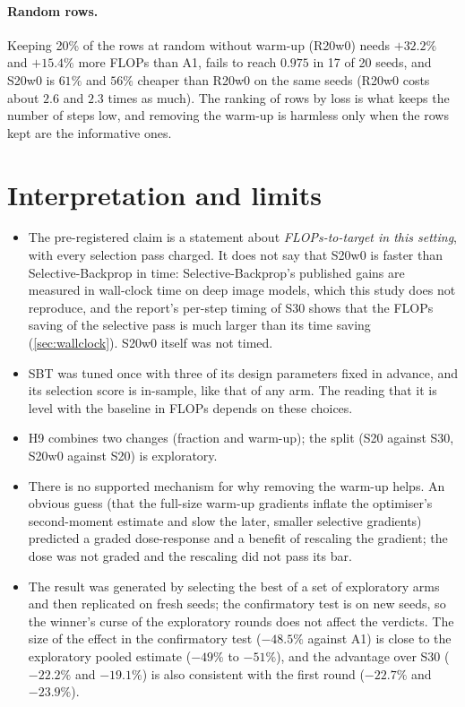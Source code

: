 \paragraph{Random rows.} Keeping 20\% of the rows at random without warm-up (R20w0) needs $+32.2\%$ and $+15.4\%$ more FLOPs than A1, fails to reach $0.975$ in 17 of 20 seeds, and S20w0 is $61\%$ and $56\%$ cheaper than R20w0 on the same seeds (R20w0 costs about $2.6$ and $2.3$ times as much). The ranking of rows by loss is what keeps the number of steps low, and removing the warm-up is harmless only when the rows kept are the informative ones.

\section{Interpretation and limits}
\begin{itemize}
\item The pre-registered claim is a statement about \emph{FLOPs-to-target in this setting}, with every selection pass charged. It does not say that S20w0 is faster than Selective-Backprop in time: Selective-Backprop's published gains are measured in wall-clock time on deep image models, which this study does not reproduce, and the report's per-step timing of S30 shows that the FLOPs saving of the selective pass is much larger than its time saving (\cref{sec:wallclock}). S20w0 itself was not timed.
\item SBT was tuned once with three of its design parameters fixed in advance, and its selection score is in-sample, like that of any arm. The reading that it is level with the baseline in FLOPs depends on these choices.
\item H9 combines two changes (fraction and warm-up); the split (S20 against S30, S20w0 against S20) is exploratory.
\item There is no supported mechanism for why removing the warm-up helps. An obvious guess (that the full-size warm-up gradients inflate the optimiser's second-moment estimate and slow the later, smaller selective gradients) predicted a graded dose-response and a benefit of rescaling the gradient; the dose was not graded and the rescaling did not pass its bar.
\item The result was generated by selecting the best of a set of exploratory arms and then replicated on fresh seeds; the confirmatory test is on new seeds, so the winner's curse of the exploratory rounds does not affect the verdicts. The size of the effect in the confirmatory test ($-48.5\%$ against A1) is close to the exploratory pooled estimate ($-49\%$ to $-51\%$), and the advantage over S30 ($-22.2\%$ and $-19.1\%$) is also consistent with the first round ($-22.7\%$ and $-23.9\%$).
\end{itemize}

